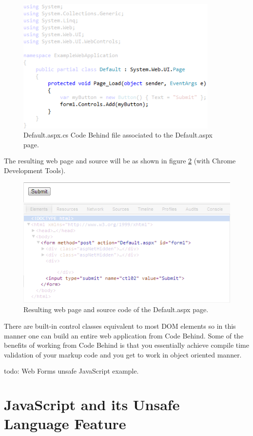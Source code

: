 				\begin{figure}
					\includegraphics[width=10cm]{resources/images/CodeBehind.png}
				\caption{Default.aspx.cs Code Behind file associated to the Default.aspx page.}
				\label{codeBehind}
			\end{figure}
		The resulting web page and source will be as shown in figure \ref{html} (with Chrome Development Tools).

				\begin{figure}
					\includegraphics[width=12cm]{resources/images/Html.png}
				\caption{Resulting web page and source code of the Default.aspx page.}
				\label{html}
			\end{figure}
		There are built-in control classes equivalent to most DOM elements so in this manner one can build an entire web application from Code Behind. Some of the benefits of working from Code Behind is that you essentially achieve compile time validation of your markup code and you get to work in object oriented manner.

		todo: Web Forms unsafe JavaScript example.


\section{JavaScript and its Unsafe Language Feature} %
\label{sec:javascript_and_its_unsafe_language_feature}
	
